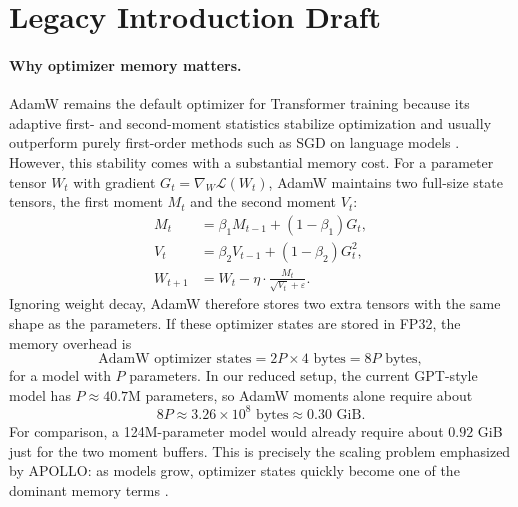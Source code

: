\documentclass[10pt]{article}
\begin{document}
\iffalse
\section{Legacy Introduction Draft}
\paragraph{Why optimizer memory matters.}
AdamW remains the default optimizer for Transformer training because its adaptive first- and second-moment statistics stabilize optimization and usually outperform purely first-order methods such as SGD on language models \cite{kingma2014adam, loshchilov2019decoupled, zhang2024transformers}. However, this stability comes with a substantial memory cost. For a parameter tensor $W_t$ with gradient $G_t = \nabla_W \mathcal{L}(W_t)$, AdamW maintains two full-size state tensors, the first moment $M_t$ and the second moment $V_t$:
\begin{align}
M_t &= \beta_1 M_{t-1} + (1-\beta_1) G_t, \\
V_t &= \beta_2 V_{t-1} + (1-\beta_2) G_t^2, \\
W_{t+1} &= W_t - \eta \cdot \frac{M_t}{\sqrt{V_t} + \varepsilon}.
\end{align}
Ignoring weight decay, AdamW therefore stores two extra tensors with the same shape as the parameters. If these optimizer states are stored in FP32, the memory overhead is
\begin{equation}
\text{AdamW optimizer states} = 2P \times 4 \text{ bytes} = 8P \text{ bytes},
\end{equation}
for a model with $P$ parameters. In our reduced setup, the current GPT-style model has $P \approx 40.7$M parameters, so AdamW moments alone require about
\begin{equation}
8P \approx 3.26 \times 10^8 \text{ bytes} \approx 0.30 \text{ GiB}.
\end{equation}
For comparison, a 124M-parameter model would already require about $0.92$ GiB just for the two moment buffers. This is precisely the scaling problem emphasized by APOLLO: as models grow, optimizer states quickly become one of the dominant memory terms \cite{apollo2025}.
\end{document}

